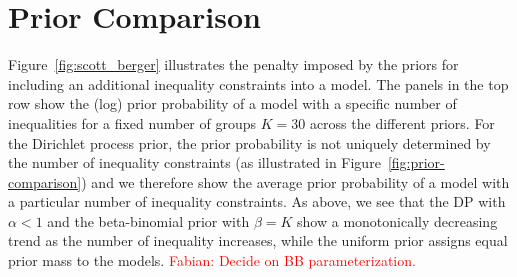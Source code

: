 \documentclass[11pt,a4paper]{article}
\theoremstyle{definition} %
\theoremstyle{case}
\newcommand{\FD}[1]{\textcolor{red}{Fabian: #1 }}
\begin{document}

\printbibliography

\newpage
\appendix

\iffalse
\section{Prior Comparison} \label{sec:scott-berger}
Figure~\ref{fig:scott_berger} illustrates the penalty imposed by the priors for including an additional inequality constraints into a model. The panels in the top row show the (log) prior probability of a model with a specific number of inequalities for a fixed number of groups $K = 30$ across the different priors. For the Dirichlet process prior, the prior probability is not uniquely determined by the number of inequality constraints (as illustrated in Figure~\ref{fig:prior-comparison}) and we therefore show the average prior probability of a model with a particular number of inequality constraints. As above, we see that the DP with $\alpha < 1$ and the beta-binomial prior with $\beta = K$ show a monotonically decreasing trend as the number of inequality increases, while the uniform prior assigns equal prior mass to the models. \FD{Decide on BB parameterization.}
\end{document}
